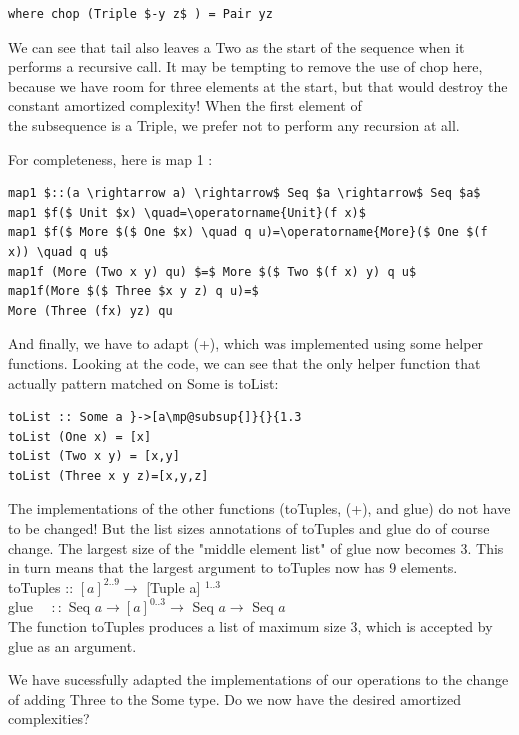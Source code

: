 \documentclass[10pt]{article}
\begin{document}
\begin{verbatim}
where chop (Triple $-y z$ ) = Pair yz
\end{verbatim}

We can see that tail also leaves a Two as the start of the sequence when it performs a recursive call. It may be tempting to remove the use of chop here, because we have room for three elements at the start, but that would destroy the constant amortized complexity! When the first element of\\
the subsequence is a Triple, we prefer not to perform any recursion at all.

For completeness, here is map 1 :

\begin{verbatim}
map1 $::(a \rightarrow a) \rightarrow$ Seq $a \rightarrow$ Seq $a$
map1 $f($ Unit $x) \quad=\operatorname{Unit}(f x)$
map1 $f($ More $($ One $x) \quad q u)=\operatorname{More}($ One $(f x)) \quad q u$
map1f (More (Two x y) qu) $=$ More $($ Two $(f x) y) q u$
map1f(More $($ Three $x y z) q u)=$
More (Three (fx) yz) qu
\end{verbatim}

And finally, we have to adapt (+), which was implemented using some helper functions. Looking at the code, we can see that the only helper function that actually pattern matched on Some is toList:

\begin{verbatim}
toList :: Some a }->[a\mp@subsup{]}{}{1.3
toList (One x) = [x]
toList (Two x y) = [x,y]
toList (Three x y z)=[x,y,z]
\end{verbatim}

The implementations of the other functions (toTuples, (+), and glue) do not have to be changed! But the list sizes annotations of toTuples and glue do of course change. The largest size of the "middle element list" of glue now becomes 3. This in turn means that the largest argument to toTuples now has 9 elements.\\
toTuples :: $[a]^{2 . .9} \rightarrow$ [Tuple a] ${ }^{1 . .3}$\\
glue $\quad::$ Seq $a \rightarrow[a]^{0 . .3} \rightarrow$ Seq $a \rightarrow$ Seq $a$\\
The function toTuples produces a list of maximum size 3, which is accepted by glue as an argument.

We have sucessfully adapted the implementations of our operations to the change of adding Three to the Some type. Do we now have the desired amortized complexities?
\end{document}
